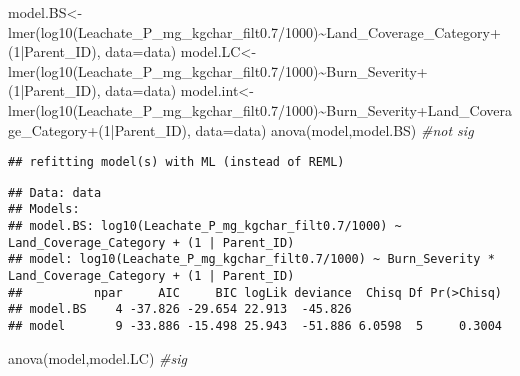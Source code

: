 \documentclass[
]{article}
\newenvironment{Shaded}{\begin{snugshade}}{\end{snugshade}}
\newcommand{\AttributeTok}[1]{\textcolor[rgb]{0.77,0.63,0.00}{#1}}
\newcommand{\CommentTok}[1]{\textcolor[rgb]{0.56,0.35,0.01}{\textit{#1}}}
\newcommand{\DecValTok}[1]{\textcolor[rgb]{0.00,0.00,0.81}{#1}}
\newcommand{\FloatTok}[1]{\textcolor[rgb]{0.00,0.00,0.81}{#1}}
\newcommand{\FunctionTok}[1]{\textcolor[rgb]{0.00,0.00,0.00}{#1}}
\newcommand{\NormalTok}[1]{#1}
\newcommand{\OtherTok}[1]{\textcolor[rgb]{0.56,0.35,0.01}{#1}}
\newcommand{\SpecialCharTok}[1]{\textcolor[rgb]{0.00,0.00,0.00}{#1}}
\begin{document}
\begin{Shaded}
\begin{Highlighting}[]
\NormalTok{model.BS}\OtherTok{\textless{}{-}}\FunctionTok{lmer}\NormalTok{(}\FunctionTok{log10}\NormalTok{(Leachate\_P\_mg\_kgchar\_filt0}\FloatTok{.7}\SpecialCharTok{/}\DecValTok{1000}\NormalTok{)}\SpecialCharTok{\textasciitilde{}}\NormalTok{Land\_Coverage\_Category}\SpecialCharTok{+}\NormalTok{(}\DecValTok{1}\SpecialCharTok{|}\NormalTok{Parent\_ID), }\AttributeTok{data=}\NormalTok{data)}
\NormalTok{model.LC}\OtherTok{\textless{}{-}}\FunctionTok{lmer}\NormalTok{(}\FunctionTok{log10}\NormalTok{(Leachate\_P\_mg\_kgchar\_filt0}\FloatTok{.7}\SpecialCharTok{/}\DecValTok{1000}\NormalTok{)}\SpecialCharTok{\textasciitilde{}}\NormalTok{Burn\_Severity}\SpecialCharTok{+}\NormalTok{(}\DecValTok{1}\SpecialCharTok{|}\NormalTok{Parent\_ID), }\AttributeTok{data=}\NormalTok{data)}
\NormalTok{model.int}\OtherTok{\textless{}{-}}\FunctionTok{lmer}\NormalTok{(}\FunctionTok{log10}\NormalTok{(Leachate\_P\_mg\_kgchar\_filt0}\FloatTok{.7}\SpecialCharTok{/}\DecValTok{1000}\NormalTok{)}\SpecialCharTok{\textasciitilde{}}\NormalTok{Burn\_Severity}\SpecialCharTok{+}\NormalTok{Land\_Coverage\_Category}\SpecialCharTok{+}\NormalTok{(}\DecValTok{1}\SpecialCharTok{|}\NormalTok{Parent\_ID), }\AttributeTok{data=}\NormalTok{data)}
\FunctionTok{anova}\NormalTok{(model,model.BS) }\CommentTok{\#not sig}
\end{Highlighting}
\end{Shaded}

\begin{verbatim}
## refitting model(s) with ML (instead of REML)
\end{verbatim}

\begin{verbatim}
## Data: data
## Models:
## model.BS: log10(Leachate_P_mg_kgchar_filt0.7/1000) ~ Land_Coverage_Category + (1 | Parent_ID)
## model: log10(Leachate_P_mg_kgchar_filt0.7/1000) ~ Burn_Severity * Land_Coverage_Category + (1 | Parent_ID)
##          npar     AIC     BIC logLik deviance  Chisq Df Pr(>Chisq)
## model.BS    4 -37.826 -29.654 22.913  -45.826                     
## model       9 -33.886 -15.498 25.943  -51.886 6.0598  5     0.3004
\end{verbatim}

\begin{Shaded}
\begin{Highlighting}[]
\FunctionTok{anova}\NormalTok{(model,model.LC) }\CommentTok{\#sig}
\end{Highlighting}
\end{Shaded}
\end{document}
